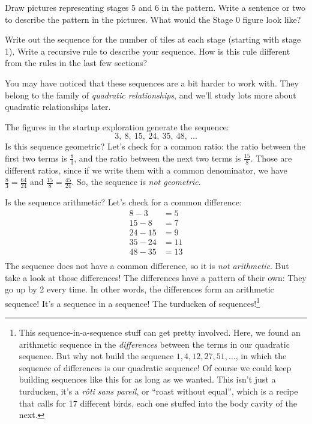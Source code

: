 \begin{boxedexplore}
Draw pictures representing stages 5 and 6 in the pattern. Write a sentence or two to describe the pattern in the pictures. What would the Stage 0 figure look like?

Write out the sequence for the number of tiles at each stage (starting with stage 1). Write a recursive rule to describe your sequence. How is this rule different from the rules in the last few sections?
\end{boxedexplore} %

You may have noticed that these sequences are a bit harder to work with. They belong to the family of \textit{quadratic relationships}, and we'll study lots more about quadratic relationships later.

The figures in the startup exploration generate the sequence: \[3,~ 8,~ 15,~ 24,~35,~48,~\dotsc\]
Is this sequence geometric? Let's check for a common ratio: the ratio between the first two terms is $\frac{8}{3}$, and the ratio between the next two terms is $\frac{15}{8}$. Those are different ratios, since if we write them with a common denominator, we have $\frac{8}{3}=\frac{64}{24}$ and $\frac{15}{8}=\frac{45}{24}$. So, the sequence is \textit{not geometric}.

Is the sequence arithmetic? Let's check for a common difference:
\[\begin{aligned}
8-3 &=5\\
15-8 &=7\\
24-15 &=9\\
35-24 &=11\\
48-35 &=13\\
\end{aligned}\]
The sequence does not have a common difference, so it is \textit{not arithmetic}. But take a look at those differences! The differences have a pattern of their own: They go up by 2 every time. In other words, the differences form an arithmetic sequence! It's a sequence in a sequence! The turducken of sequences!\footnote{This sequence-in-a-sequence stuff can get pretty involved. Here, we found an arithmetic sequence in the \textit{differences} between the terms in our quadratic sequence. But why not build the sequence $1, 4, 12, 27, 51,\dotsc$, in which the sequence of differences is our quadratic sequence! Of course we could keep building sequences like this for as long as we wanted. This isn't just a turducken, it's a \textit{r\^oti sans pareil}, or ``roast without equal'', which is a recipe that calls for 17 different birds, each one stuffed into the body cavity of the next.}

